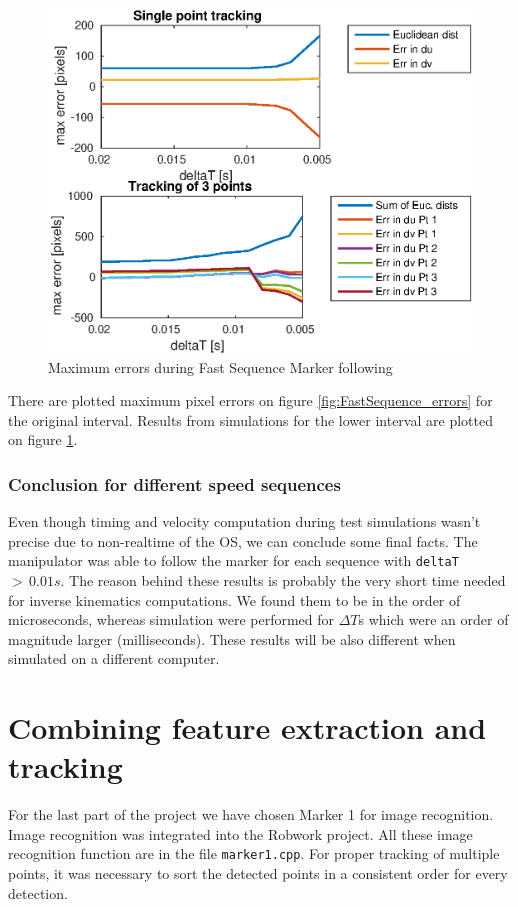 \documentclass[]{scrartcl}
\begin{document}
\begin{figure}
	\centering
	\includegraphics[width=0.7\linewidth]{fig/FastSequence_low_dTs_errors.eps}
	\caption{Maximum errors during Fast Sequence Marker following}
	\label{fig:FastSequence_low_dTs_errors}
\end{figure}

There are plotted maximum pixel errors on figure \ref{fig:FastSequence_errors} for the original interval. Results from simulations for the lower interval are plotted on figure \ref{fig:FastSequence_low_dTs_errors}.

\subsubsection*{Conclusion for different speed sequences}
Even though timing and velocity computation during test simulations wasn't precise due to non-realtime of the OS, we can conclude some final facts. 
The manipulator was able to follow the marker for each sequence with \texttt{deltaT} $ >\, 0.01 s$. The reason behind these results is probably the very short time needed for inverse kinematics computations. We found them to be in the order of microseconds, whereas simulation were performed for $\Delta T$s which were an order of magnitude larger (milliseconds). These results will be also different when simulated on a different computer.

\clearpage
\section{Combining feature extraction and tracking} 
For the last part of the project we have chosen Marker 1 for image recognition. Image recognition was integrated into the Robwork project. All these image recognition function are in the file \texttt{marker1.cpp}. For proper tracking of multiple points, it was necessary to sort the detected points in a consistent order for every detection.
\end{document}
